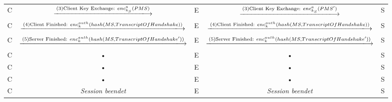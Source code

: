 \documentclass[10pt,pdftex,a4paper]{article}
\begin{document}
\begin{sidewaystable}
\begin{tabular}{|c|c|c|c|c|}
C &  $\xlongrightarrow{\text{(3)Client Key Exchange: } enc^{a}_{k_{S}}(PMS)}$  & E &  $\xlongrightarrow{\text{(3)Client Key Exchange: } enc^{a}_{k_{S}}(PMS')}$  & S \\ 

C &  $\xlongrightarrow{\text{(4)Client Finished: } enc_{k}^{auth}(hash(MS, TranscriptOfHandshake))}$  & E &  $\xlongrightarrow{\text{(4)Client Finished: } enc_{k}^{auth}(hash(MS, TranscriptOfHandshake))}$  & S \\ 

C &  $\xlongrightarrow{\text{(5)Server Finished: } enc_{k}^{auth}(hash(MS, TranscriptOfHandshake'))}$ & E &  $\xlongrightarrow{\text{(5)Server Finished: } enc_{k}^{auth}(hash(MS, TranscriptOfHandshake'))}$ & S \\ 
C & • & E & • & S \\ 
C & • & E & • & S \\ 
C & • & E & • & S \\ 
C & \textit{Session beendet} & E & \textit{Session beendet} & S \\ 
\end{tabular} 
\end{sidewaystable}
\end{document}
